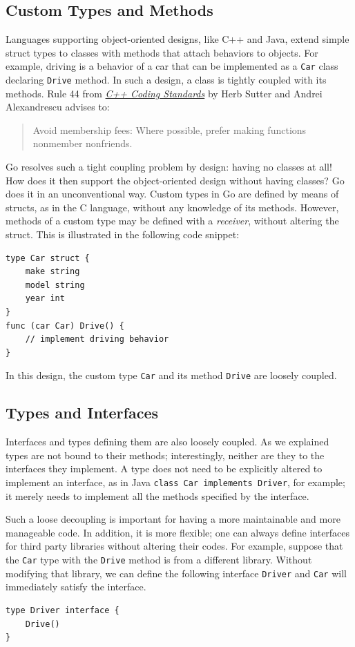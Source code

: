 \documentclass[11pt]{article}
\begin{document}
\subsection*{Custom Types and Methods}
\label{sec:orgheadline7}
Languages supporting object-oriented designs, like C++ and Java, extend simple struct types to classes with methods that attach behaviors to objects. For example, driving is a behavior of a car that can be implemented as a \texttt{Car} class declaring \texttt{Drive} method. In such a design, a class is tightly coupled with its methods. Rule 44 from \href{http://www.gotw.ca/publications/c++cs.htm}{\emph{C++ Coding Standards}} by Herb Sutter and Andrei Alexandrescu advises to:
\begin{quote}
Avoid membership fees: Where possible, prefer making functions nonmember nonfriends.
\end{quote}

Go resolves such a tight coupling problem by design: having no classes at all! How does it then support the object-oriented design without having classes? Go does it in an unconventional way. Custom types in Go are defined by means of structs, as in the C language, without any knowledge of its methods. However, methods of a custom type may be defined with a \emph{receiver}, without altering the struct. This is illustrated in the following code snippet:
\begin{verbatim}
type Car struct {
    make string
    model string
    year int
}
func (car Car) Drive() {
    // implement driving behavior
}
\end{verbatim}
In this design, the custom type \texttt{Car} and its method \texttt{Drive} are loosely coupled.

\subsection*{Types and Interfaces}
\label{sec:orgheadline8}
Interfaces and types defining them are also loosely coupled. As we explained types are not bound to their methods; interestingly, neither are they to the interfaces they implement. A type does not need to be explicitly altered to implement an interface, as in Java \texttt{class Car implements Driver}, for example; it merely needs to implement all the methods specified by the interface.

Such a loose decoupling is important for having a more maintainable and more manageable code. In addition, it is more flexible; one can always define interfaces for third party libraries without altering their codes. For example, suppose that the \texttt{Car} type with the \texttt{Drive} method is from a different library. Without modifying that library, we can define the following interface \texttt{Driver} and \texttt{Car} will immediately satisfy the interface.
\begin{verbatim}
type Driver interface {
    Drive()
}
\end{verbatim}
\end{document}
